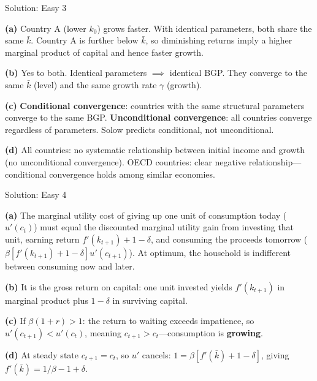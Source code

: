 \documentclass[aspectratio=169,10pt]{beamer}
\newcommand{\backbutton}[1]{\hfill\hyperlink{#1}{\beamerbutton{Back}}}
\begin{document}
\begin{frame}{Solution: Easy 3}
\hypertarget{s-e3}{}

\textbf{(a)} Country A (lower $k_0$) grows faster. With identical parameters, both share the same $\bar{k}$. Country A is further below $\bar{k}$, so diminishing returns imply a higher marginal product of capital and hence faster growth.

\medskip
\textbf{(b)} Yes to both. Identical parameters $\implies$ identical BGP. They converge to the same $\bar{k}$ (level) and the same growth rate $\gamma$ (growth).

\medskip
\textbf{(c)} \textbf{Conditional convergence}: countries with the same structural parameters converge to the same BGP. \textbf{Unconditional convergence}: all countries converge regardless of parameters. Solow predicts conditional, not unconditional.

\medskip
\textbf{(d)} All countries: no systematic relationship between initial income and growth (no unconditional convergence). OECD countries: clear negative relationship---conditional convergence holds among similar economies.
\backbutton{q-e3}
\end{frame}

\begin{frame}{Solution: Easy 4}
\hypertarget{s-e4}{}

\textbf{(a)} The marginal utility cost of giving up one unit of consumption today ($u'(c_t)$) must equal the discounted marginal utility gain from investing that unit, earning return $f'(k_{t+1})+1-\delta$, and consuming the proceeds tomorrow ($\beta[f'(k_{t+1})+1-\delta]u'(c_{t+1})$). At optimum, the household is indifferent between consuming now and later.

\medskip
\textbf{(b)} It is the gross return on capital: one unit invested yields $f'(k_{t+1})$ in marginal product plus $1-\delta$ in surviving capital.

\medskip
\textbf{(c)} If $\beta(1+r)>1$: the return to waiting exceeds impatience, so $u'(c_{t+1})<u'(c_t)$, meaning $c_{t+1}>c_t$---consumption is \textbf{growing}.

\medskip
\textbf{(d)} At steady state $c_{t+1}=c_t$, so $u'$ cancels: $1 = \beta[f'(\bar{k})+1-\delta]$, giving $f'(\bar{k})=1/\beta - 1+\delta$.
\backbutton{q-e4}
\end{frame}
\end{document}
